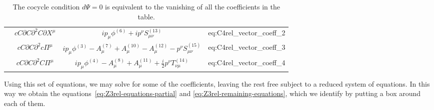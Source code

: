 \documentclass[11pt,reqno,a4paper,final]{amsart}
\theoremstyle{plain}
\theoremstyle{definition}
\renewcommand{\d}{\partial}
\newcommand{\phisup}[1]{\phi^{(#1)}}
\newcommand{\Asup}[1]{A^{(#1)}}
\newcommand{\Tsup}[1]{T^{(#1)}}
\newcommand{\Ssup}[1]{S^{(#1)}}
\newcommand{\1}{\mathbb{1}}
\numberwithin{equation}{section}
\begin{document}
\begin{appendices}
\begin{table}[h]
\begin{tabular}{|c|c|c L|}
                               & $cC \d C \d^2 C \d X^\mu$ & $i p_\mu \phisup{6} + i p^\nu \Ssup{13}_{\mu\nu} $  & eq:C4rel_vector_coeff_2 \\
                               & $cC \d C \d^2 c \Pi^\mu$ & $i p_\mu \phisup{3} - \Asup{7}_\mu+ \Asup{10}_\mu - \Asup{12}_\mu - p^\nu \Ssup{15}_{\mu\nu}  $  & eq:C4rel_vector_coeff_3 \\
                               & $cC \d C \d^2 C \Pi^\mu$ & $i p_\mu \phisup{4} - \Asup{8}_\mu + \Asup{11}_\mu + \tfrac i2 p^\nu \Tsup{14}_{\nu\mu}$  & eq:C4rel_vector_coeff_4 \\ \bottomrule
    \end{tabular}
\caption*{The cocycle condition $d\Psi = 0$ is equivalent to the
  vanishing of all the coefficients in the table.}
\end{table}

Using this set of equations, we may solve for some of the
coefficients, leaving the rest free subject to a reduced system of
equations.  In this way we obtain the
equations~\eqref{eq:Z3rel-equations-partial} and
\eqref{eq:Z3rel-remaining-equations}, which we identify by putting a
box around each of them.


\end{appendices}
\end{document}
